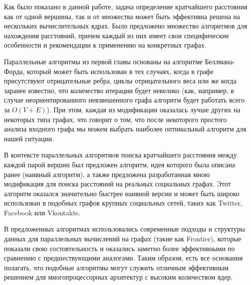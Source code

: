 \startconclusionpage

Как было показано в данной работе, задача определение кратчайшего расстояния как от одной вершины, так и от множества может быть эффективна решена на нескольких вычислительных ядрах. Было предложено множество алгоритмов для нахождения расстояний, причем каждый из них имеет свои специфические особенности и рекомендации к применению на конкретных графах.

Параллельные алгоритмы из первой главы основаны на алгоритме Беллмана-Форда, который может быть использован в тех случаях, когда в графе присутствуют отрицательные ребра, циклы отрицательного веса или же когда заранее известно, что количество итерации будет невелико (как, например, в случае неориентированного невзвешенного графа алгоритм будет работать всего за $O(V + E)$). При этом, каждая из модификации оказалась лучше других на некоторых типа графах, что говорит о том, что после некоторого простого анализа входного графа мы можем выбрать наиболее оптимальный алгоритм для нашей ситуации.

В контексте параллельных алгоритмов поиска кратчайшего расстояния между каждой парой вершин был предложен алгоритм, идея которого была описана ранее (наивный алгоритм), а также предложена разработанная мною модификация для поиска расстояний на реальных социальных графах. Этот алгоритм оказался значительно быстрее наивной версии и может быть широко использован в подобных графов крупных социальных сетей, таких как Twitter, Facebook или Vkontakte. 

В предложенных алгоритмах использовались современные подходы и структуры данных для параллельных вычислений на графах (такие как Frontier), которые показали свою состоятельность и оказались заметно более эффективными по сравнению с предшествующими аналогами. Таким образом, есть все основания полагать, что подобные алгоритмы могут служить отличным эффективным решением для многопроцессорных архитектур с высоким количеством ядер.

\cite{FRONTIERSEARCH}
\cite{LIGRA}
\cite{CHUNKEDSEQ}
\cite{STANFORDGRAPHS}
\cite{CILK} 


\FloatBarrier
